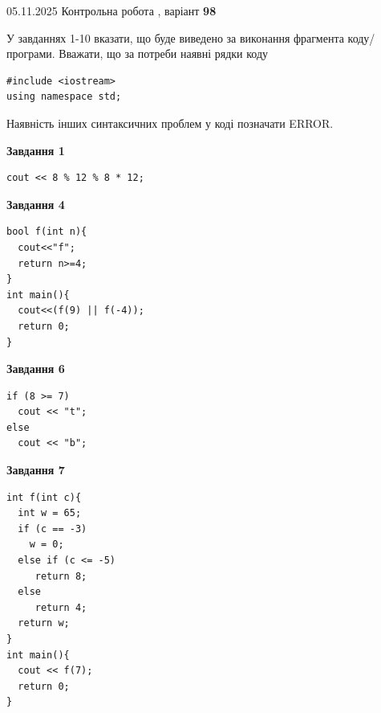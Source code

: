 \documentclass[12pt, ukrainian]{article}
\begin{document}
{\Large{05.11.2025 Контрольна робота , варіант  \No \textbf { 98 }\par}}
{
\begin {large}
У завданнях 1-10 вказати, що буде виведено за виконання фрагмента коду/про\-гра\-ми.
Вважати, що за потреби наявні рядки коду
\begin{verbatim}
#include <iostream>
using namespace std;
\end{verbatim}
Наявність інших синтаксичних проблем у коді позначати ERROR.

\begin{minipage}[t]{7.0cm}

\begin{center}
\textbf{Завдання 1}
\end{center}
\vspace{-8mm}

\begin{verbatim}
cout << 8 % 12 % 8 * 12;
\end{verbatim}



\begin{center}
\textbf{Завдання 4}
\end{center}
\vspace{-8mm}

\begin{verbatim}
bool f(int n){
  cout<<"f";
  return n>=4;
}
int main(){
  cout<<(f(9) || f(-4));
  return 0;
}
\end{verbatim}



\begin{center}
\textbf{Завдання 6}
\end{center}
\vspace{-8mm}

\begin{verbatim}
if (8 >= 7)
  cout << "t";
else
  cout << "b";
\end{verbatim}



\begin{center}
\textbf{Завдання 7}
\end{center}
\vspace{-8mm}

\begin{verbatim}
int f(int c){
  int w = 65;
  if (c == -3)
    w = 0;
  else if (c <= -5)
     return 8;
  else
     return 4;
  return w;
}
int main(){
  cout << f(7);
  return 0;
}
\end{verbatim}


\end{minipage}
\end{large}}
\end{document}
